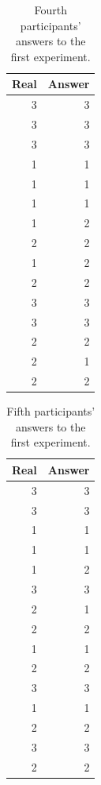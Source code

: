 \documentclass[uplatex,
12pt, %
a4paper,
english, %
oneside,
titlepage,
singlespacing, %
liststotoc, %
headsepline,
]{MastersDoctoralThesis} %
\begin{document}
\begin{appendices}
\begin{table}[H]
  \centering
  \caption{Fourth participants' answers to the first experiment.}
    \begin{tabular}{|r|r|}
    \toprule
    \multicolumn{1}{|l|}{Real} & \multicolumn{1}{l|}{Answer} \\
    \midrule
    3     & 3 \\
    \midrule
    3     & 3 \\
    \midrule
    3     & 3 \\
    \midrule
    1     & 1 \\
    \midrule
    1     & 1 \\
    \midrule
    1     & 1 \\
    \midrule
    1     & 2 \\
    \midrule
    2     & 2 \\
    \midrule
    1     & 2 \\
    \midrule
    2     & 2 \\
    \midrule
    3     & 3 \\
    \midrule
    3     & 3 \\
    \midrule
    2     & 2 \\
    \midrule
    2     & 1 \\
    \midrule
    2     & 2 \\
    \bottomrule
    \end{tabular}%
  \label{tab:Ex1_4}%
\end{table}%

\begin{table}[H]
  \centering
  \caption{Fifth participants' answers to the first experiment.}
    \begin{tabular}{|r|r|}
    \toprule
    \multicolumn{1}{|l|}{Real} & \multicolumn{1}{l|}{Answer} \\
    \midrule
    3     & 3 \\
    \midrule
    3     & 3 \\
    \midrule
    1     & 1 \\
    \midrule
    1     & 1 \\
    \midrule
    1     & 2 \\
    \midrule
    3     & 3 \\
    \midrule
    2     & 1 \\
    \midrule
    2     & 2 \\
    \midrule
    1     & 1 \\
    \midrule
    2     & 2 \\
    \midrule
    3     & 3 \\
    \midrule
    1     & 1 \\
    \midrule
    2     & 2 \\
    \midrule
    3     & 3 \\
    \midrule
    2     & 2 \\
    \bottomrule
    \end{tabular}%
  \label{tab:Ex1_5}%
\end{table}%


\end{appendices}
\end{document}
